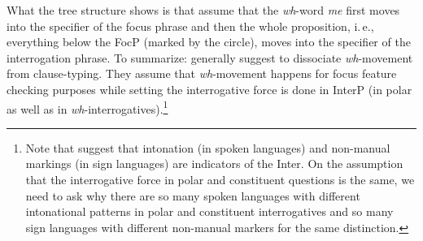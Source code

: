 \begin{exe}
\ex\label{ex:lelederivationabohpfau} 
\end{exe}

\noindent What the tree structure shows is that \citet{aboh2010sa} assume that the \textit{wh}-word \textit{me} first moves into the specifier of the focus phrase and then the whole proposition, i.\,e., everything below the FocP (marked by the circle), moves into the specifier of the interrogation phrase. To summarize: \citet{aboh2010sa} generally suggest to dissociate \textit{wh}-movement from clause-typing. They assume that \textit{wh}-movement happens for focus feature checking purposes while setting the interrogative force is done in InterP (in polar as well as in \textit{wh}-interrogatives).\footnote{ Note that \citet{aboh2010sa} suggest that intonation (in spoken languages) and non-manual markings (in sign languages) are indicators of the Inter\textdegree . On the assumption that the interrogative force in polar and constituent questions is the same, we need to ask why there are so many spoken languages with different intonational patterns in polar and constituent interrogatives and so many sign languages with different non-manual markers for the same distinction.} 

